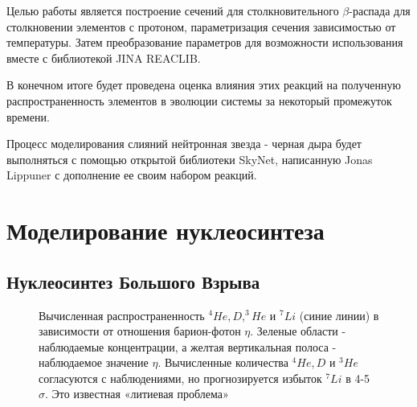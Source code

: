 \documentclass[14pt, a4paper]{article}
\numberwithin{figure}{section}
\numberwithin{equation}{section}
\begin{document}
Целью работы является построение сечений для столкновительного $\beta$-распада для столкновении элементов с протоном, параметризация сечения зависимостью от температуры. Затем преобразование параметров для возможности использования вместе с библиотекой JINA REACLIB. 

В конечном итоге будет проведена оценка влияния этих реакций на полученную распространенность элементов в эволюции системы за некоторый промежуток времени.

Процесс моделирования слияний нейтронная звезда - черная дыра будет выполняться с помощью открытой библиотеки SkyNet, написанную Jonas Lippuner с дополнение ее своим набором реакций.

\section{Моделирование нуклеосинтеза}

\subsection{Нуклеосинтез Большого Взрыва}

\begin{figure}[ht]
	\caption{Вычисленная распространенность $^4He, D, ^3He$ и $^7Li$ (синие линии) в зависимости от отношения барион-фотон $\eta$. Зеленые области - наблюдаемые концентрации, а желтая вертикальная полоса - наблюдаемое значение $\eta$. Вычисленные количества $^4He, D$ и $^3He$ согласуются с наблюдениями, но прогнозируется избыток $^7Li$ в 4-5 $\sigma$. Это известная «литиевая проблема»}
	\label{ris:Cocetal}
\end{figure}
\end{document}
